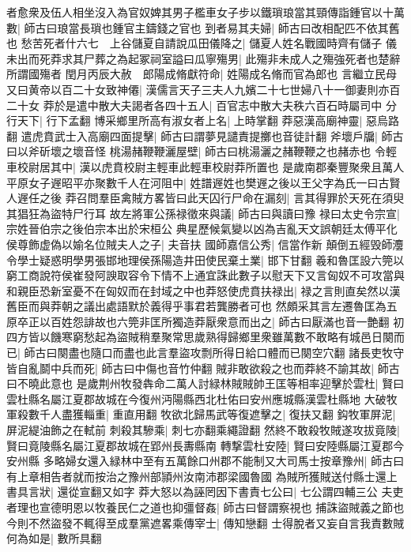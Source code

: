 者愈衆及伍人相坐沒入為官奴婢其男子檻車女子步以鐵瑣琅當其頸傳詣鍾官以十萬數|{
	師古曰琅當長瑣也鍾官主鑄錢之官也}
到者易其夫婦|{
	師古曰改相配匹不依其舊也}
愁苦死者什六七　上谷儲夏自請說瓜田儀降之|{
	儲夏人姓名戰國時齊有儲子}
儀未出而死莽求其尸葬之為起冢祠室謚曰瓜寧殤男|{
	此殤非未成人之殤強死者也楚辭所謂國殤者}
閏月丙辰大赦　郎陽成脩獻符命|{
	姓陽成名脩而官為郎也}
言繼立民母又曰黄帝以百二十女致神僊|{
	漢儒言天子三夫人九嬪二十七世婦八十一御妻則亦百二十女}
莽於是遣中散大夫謁者各四十五人|{
	百官志中散大夫秩六百石時屬司中}
分行天下|{
	行下孟翻}
博采鄉里所高有淑女者上名|{
	上時掌翻}
莽惡漢高廟神靈|{
	惡烏路翻}
遣虎賁武士入高廟四面提擊|{
	師古曰謂夢見譴責提擲也音徒計翻}
斧壞戶牖|{
	師古曰以斧斫壞之壞音怪}
桃湯赭鞭鞭灑屋壁|{
	師古曰桃湯灑之赭鞭鞭之也赭赤也}
令輕車校尉居其中|{
	漢以虎賁校尉主輕車此輕車校尉莽所置也}
是歲南郡秦豐聚衆且萬人平原女子遟昭平亦聚數千人在河阻中|{
	姓譜遟姓也樊遟之後以王父字為氏一曰古賢人遟任之後}
莽召問羣臣禽賊方畧皆曰此天囚行尸命在漏刻|{
	言其得罪於天死在須臾其猖狂為盜特尸行耳}
故左將軍公孫禄徵來與議|{
	師古曰與讀曰豫}
禄曰太史令宗宣|{
	宗姓晉伯宗之後伯宗本出於宋桓公}
典星歷候氣變以凶為吉亂天文誤朝廷太傅平化侯尊飾虚偽以媮名位賊夫人之子|{
	夫音扶}
國師嘉信公秀|{
	信當作新}
顛倒五經毁師灋令學士疑惑明學男張邯地理侯孫陽造井田使民棄土業|{
	邯下甘翻}
羲和魯匡設六筦以窮工商說符侯崔發阿諛取容令下情不上通宜誅此數子以慰天下又言匈奴不可攻當與和親臣恐新室憂不在匈奴而在封域之中也莽怒使虎賁扶禄出|{
	禄之言則直矣然以漢舊臣而與莽朝之議出處語默於義得乎事君若龔勝者可也}
然頗采其言左遷魯匡為五原卒正以百姓怨誹故也六筦非匡所獨造莽厭衆意而出之|{
	師古曰厭滿也音一艶翻}
初四方皆以饑寒窮愁起為盜賊稍羣聚常思歲熟得歸鄉里衆雖萬數不敢略有城邑日闋而已|{
	師古曰闋盡也隨口而盡也此言羣盜攻剽所得日給口體而已闋空穴翻}
諸長吏牧守皆自亂鬬中兵而死|{
	師古曰中傷也音竹仲翻}
賊非敢欲殺之也而莽終不諭其故|{
	師古曰不曉此意也}
是歲荆州牧發犇命二萬人討緑林賊賊帥王匡等相率迎擊於雲杜|{
	賢曰雲杜縣名屬江夏郡故城在今復州沔陽縣西北杜佑曰安州應城縣漢雲杜縣地}
大破牧軍殺數千人盡獲輜重|{
	重直用翻}
牧欲北歸馬武等復遮擊之|{
	復扶又翻}
鈎牧軍屏泥|{
	屏泥緹油飾之在軾前}
刺殺其驂乘|{
	刺七亦翻乘繩證翻}
然終不敢殺牧賊遂攻拔竟陵|{
	賢曰竟陵縣名屬江夏郡故城在郢州長夀縣南}
轉撃雲杜安陸|{
	賢曰安陸縣屬江夏郡今安州縣}
多略婦女還入緑林中至有五萬餘口州郡不能制又大司馬士按章豫州|{
	師古曰有上章相告者就而按治之豫州部頴州汝南沛郡梁國魯國}
為賊所獲賊送付縣士還上書具言狀|{
	還從宣翻又如字}
莽大怒以為誣罔因下書責七公曰|{
	七公謂四輔三公}
夫吏者理也宣德明恩以牧養民仁之道也抑彊督姦|{
	師古曰督謂察視也}
捕誅盜賊義之節也今則不然盜發不輒得至成羣黨遮畧乘傳宰士|{
	傳知戀翻}
士得脫者又妄自言我責數賊何為如是|{
	數所具翻}
